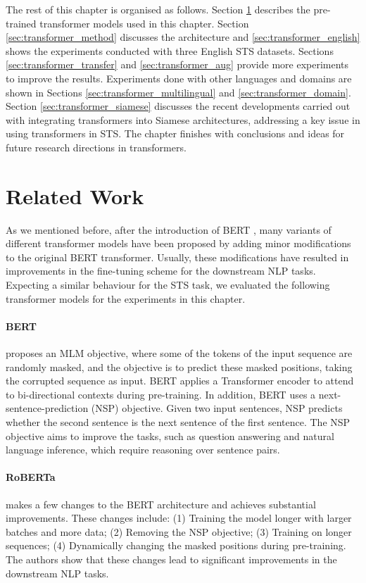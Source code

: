 The rest of this chapter is organised as follows. Section \ref{sec:transformers_related} describes the pre-trained transformer models used in this chapter. Section \ref{sec:transformer_method} discusses the architecture and \ref{sec:transformer_english} shows the experiments conducted with three English STS datasets. Sections \ref{sec:transformer_transfer} and \ref{sec:transformer_aug} provide more experiments to improve the results. Experiments done with other languages and domains are shown in Sections \ref{sec:transformer_multilingual} and \ref{sec:transformer_domain}. Section \ref{sec:transformer_siamese} discusses the recent developments carried out with integrating transformers into Siamese architectures, addressing a key issue in using transformers in STS. The chapter finishes with conclusions and ideas for future research directions in transformers. 

\section{Related Work}
\label{sec:transformers_related}
As we mentioned before, after the introduction of BERT \autocite{devlin-etal-2019-bert}, many variants of different transformer models have been proposed by adding minor modifications to the original BERT transformer. Usually, these modifications have resulted in improvements in the fine-tuning scheme for the downstream NLP tasks. Expecting a similar behaviour for the STS task, we evaluated the following transformer models for the experiments in this chapter.

\paragraph{BERT} \autocite{devlin-etal-2019-bert} proposes an MLM objective, where some of the tokens of the input sequence are randomly masked, and the objective is to predict these masked positions, taking the corrupted sequence as input. BERT applies a Transformer encoder to attend to bi-directional contexts during pre-training. In addition, BERT uses a next-sentence-prediction (NSP) objective. Given two input sentences, NSP predicts whether the second sentence is the next sentence of the first sentence. The NSP objective aims to improve the tasks, such as question answering and natural language inference, which require reasoning over sentence pairs. 

\paragraph{RoBERTa} \autocite{liu2019roberta} makes a few changes to the BERT architecture and achieves substantial improvements. These changes include: (1) Training the model longer with larger batches and more data; (2) Removing the NSP objective; (3) Training on longer sequences; (4) Dynamically changing the masked positions during pre-training. The authors show that these changes lead to significant improvements in the downstream NLP tasks.

